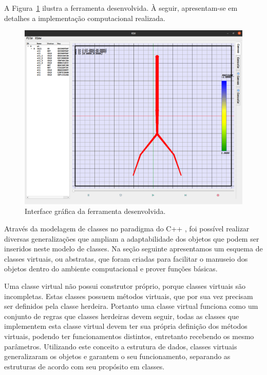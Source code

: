 \documentclass[
        english,			
        brazil			        %
        ,<...>]{abntbibufjf}
\begin{document}
A Figura~\ref{fig1:gui} ilustra a ferramenta desenvolvida. À seguir, apresentam-se em detalhes a implementação computacional realizada.

\begin{figure}[!htbp]
	\centering
	\includegraphics[scale=0.25]{Figures/IGU.png}
	\caption{Interface gráfica da ferramenta desenvolvida.}
	\label{fig1:gui}
\end{figure}

Através da modelagem de classes no paradigma do C++ \cite{AlanParker}, foi possível realizar diversas generalizações que ampliam a adaptabilidade dos objetos que podem ser inseridos neste modelo de classes. Na seção seguinte apresentamos um esquema de classes virtuais, ou abstratas, que foram criadas para facilitar o manuseio dos objetos dentro do ambiente computacional e prover funções básicas. 

Uma classe virtual não possui construtor próprio, porque classes virtuais são incompletas. Estas classes possuem métodos virtuais, que por sua vez precisam ser definidos pela classe herdeira. Portanto uma classe virtual funciona como um conjunto de regras que classes herdeiras devem seguir, todas as classes que implementem esta classe virtual devem ter sua própria definição dos métodos virtuais, podendo ter funcionamentos distintos, entretanto recebendo os mesmo parâmetros.  Utilizando este conceito a estrutura de dados, classes virtuais generalizaram os objetos e garantem o seu funcionamento, separando as estruturas de acordo com seu propósito em classes.
\end{document}
